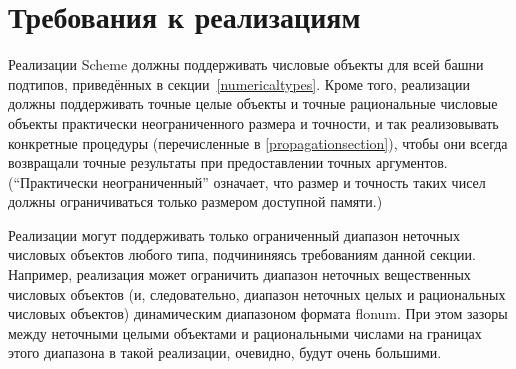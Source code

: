 \section{Требования к реализациям}\vspace{0.6mm}

\label{restrictions}

Реализации Scheme должны поддерживать числовые объекты для всей башни подтипов, приведённых в
секции~\ref{numericaltypes}. Кроме того, реализации должны поддерживать точные целые объекты
и точные рациональные числовые объекты практически неограниченного размера и точности, и так
реализовывать конкретные процедуры (перечисленные в \ref{propagationsection}), чтобы
они всегда возвращали точные результаты при предоставлении точных аргументов. (``Практически
неограниченный'' означает, что размер и точность таких чисел должны
ограничиваться только размером доступной памяти.)


Реализации могут поддерживать только ограниченный диапазон неточных числовых объектов любого
типа, подчининяясь требованиям данной секции. Например, реализация может ограничить диапазон
неточных вещественных числовых объектов (и, следовательно, диапазон неточных целых и
рациональных числовых объектов) динамическим диапазоном формата flonum. При этом зазоры
между неточными целыми объектами и рациональными числами на границах этого диапазона в такой
реализации, очевидно, будут очень большими.

